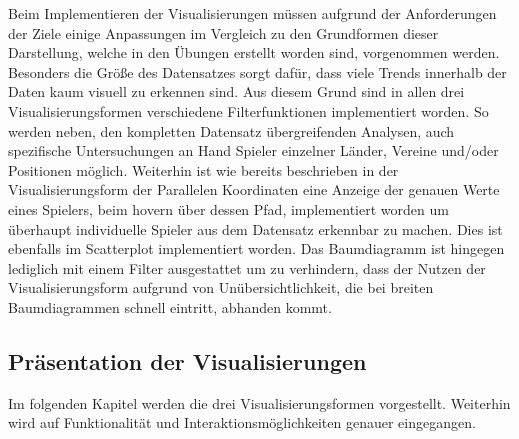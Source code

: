 \documentclass[usegeometry=true]{scrartcl}
\begin{document}
Beim Implementieren der Visualisierungen müssen aufgrund der Anforderungen der Ziele einige Anpassungen im Vergleich zu den Grundformen dieser Darstellung, welche in den Übungen erstellt worden sind, vorgenommen werden.
Besonders die Größe des Datensatzes sorgt dafür, dass viele Trends innerhalb der Daten kaum visuell zu erkennen sind. Aus diesem Grund sind in allen drei Visualisierungsformen verschiedene Filterfunktionen implementiert worden. 
So werden neben, den kompletten Datensatz übergreifenden Analysen, auch spezifische Untersuchungen an Hand Spieler einzelner Länder, Vereine und/oder Positionen möglich.
Weiterhin ist wie bereits beschrieben in der Visualisierungsform der Parallelen Koordinaten eine Anzeige der genauen Werte eines Spielers, beim hovern über dessen Pfad, implementiert worden um überhaupt individuelle Spieler aus dem Datensatz erkennbar zu machen.
Dies ist ebenfalls im Scatterplot implementiert worden.
Das Baumdiagramm ist hingegen lediglich mit einem Filter ausgestattet um zu verhindern, dass der Nutzen der Visualisierungsform aufgrund von Unübersichtlichkeit, die bei breiten Baumdiagrammen schnell eintritt, abhanden kommt. 
\subsection{Präsentation der Visualisierungen}

Im folgenden Kapitel werden die drei Visualisierungsformen vorgestellt. Weiterhin wird auf Funktionalität und Interaktionsmöglichkeiten genauer eingegangen.


\end{document}
